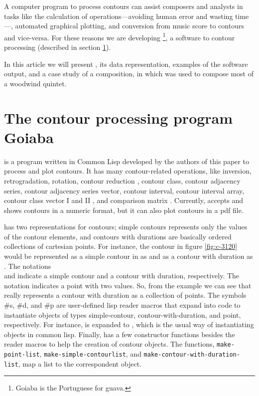 A computer program to process contours can assist composers and
analysts in tasks like the calculation of operations---avoiding human
error and wasting time---, automated graphical plotting, and
conversion from music score to contours and vice-versa. For these
reasons we are developing \goiaba{}\footnote{Goiaba is the Portuguese
  for guava.}, a software to contour processing (described in section
\ref{sec:goiaba}).

In this article we will present \goiaba{}, its data representation,
examples of the software output, and a case study of a composition, in
which \goiaba{} was used to compose most of a woodwind quintet.

\section{The contour processing program Goiaba}
\label{sec:goiaba}

\goiaba{} is a program written in Common Lisp
\cite{graham94:lisp,team07:sbcl} developed by the authors of this
paper to process and plot contours. It has many contour-related
operations, like inversion, retrogradation, rotation, contour
reduction \cite{adams76:melodic}, contour class, contour adjacency
series, contour adjacency series vector, contour interval, contour
interval array, contour class vector I and II
\cite{friedmann85:methodology}, and comparison matrix
\cite{morris93:directions}. Currently, \goiaba{} accepts and shows
contours in a numeric format, but it can also plot contours in a pdf
file.

\goiaba{} has two representations for contours; simple contours
represents only the values of the contour elements, and contours with
durations are basically ordered collections of cartesian points.  For
instance, the contour in figure \ref{fig:c-3120} would be represented
as a simple contour in \goiaba{} as  and as a
contour with duration as . The notations \\ and 
indicate a simple contour and a contour with duration,
respectively. The notation  indicates a point with two
values. So, from the example we can see that \goiaba{} really
represents a contour with duration as a collection of points. The
symbols \#s, \#d, and \#p are user-defined lisp reader macros that
expand into code to instantiate objects of types simple-contour,
contour-with-duration, and point, respectively.  For instance,
 is expanded to , which is the usual way of instantiating objects in common
lisp. Finally, \goiaba{} has a few constructor functions besides the
reader macros to help the creation of contour objects. The functions,
\texttt{make-point-list}, \texttt{make-sim\-ple-contour\-list}, and
\texttt{make-contour-with-du\-ra\-tion-list}, map a list to the
correspondent object.


